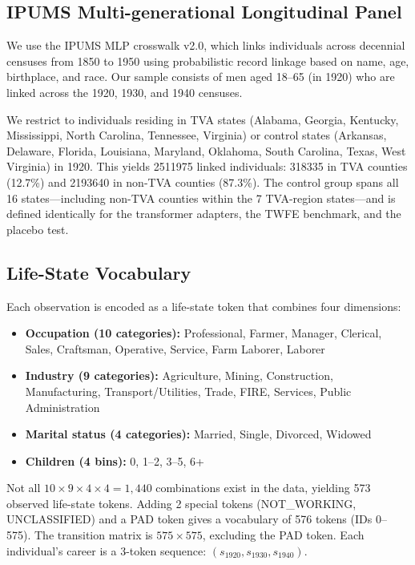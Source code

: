 \documentclass[12pt]{article}
\begin{document}
\subsection{IPUMS Multi-generational Longitudinal Panel}

We use the IPUMS MLP crosswalk v2.0, which links individuals across decennial censuses from 1850 to 1950 using probabilistic record linkage based on name, age, birthplace, and race. Our sample consists of men aged 18--65 (in 1920) who are linked across the 1920, 1930, and 1940 censuses.

We restrict to individuals residing in TVA states (Alabama, Georgia, Kentucky, Mississippi, North Carolina, Tennessee, Virginia) or control states (Arkansas, Delaware, Florida, Louisiana, Maryland, Oklahoma, South Carolina, Texas, West Virginia) in 1920. This yields \num{2511975} linked individuals: \num{318335} in TVA counties (12.7\%) and \num{2193640} in non-TVA counties (87.3\%). The control group spans all 16 states---including non-TVA counties within the 7 TVA-region states---and is defined identically for the transformer adapters, the TWFE benchmark, and the placebo test.

\subsection{Life-State Vocabulary}

Each observation is encoded as a life-state token that combines four dimensions:
\begin{itemize}
    \item \textbf{Occupation (10 categories):} Professional, Farmer, Manager, Clerical, Sales, Craftsman, Operative, Service, Farm Laborer, Laborer
    \item \textbf{Industry (9 categories):} Agriculture, Mining, Construction, Manufacturing, Transport/Utilities, Trade, FIRE, Services, Public Administration
    \item \textbf{Marital status (4 categories):} Married, Single, Divorced, Widowed
    \item \textbf{Children (4 bins):} 0, 1--2, 3--5, 6+
\end{itemize}

Not all $10 \times 9 \times 4 \times 4 = 1{,}440$ combinations exist in the data, yielding 573 observed life-state tokens. Adding 2 special tokens (NOT\_WORKING, UNCLASSIFIED) and a PAD token gives a vocabulary of 576 tokens (IDs 0--575). The transition matrix is $575 \times 575$, excluding the PAD token. Each individual's career is a 3-token sequence: $(s_{1920}, s_{1930}, s_{1940})$.
\end{document}
